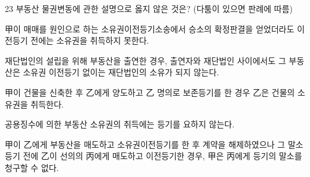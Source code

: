 \begin{question}{23}
부동산 물권변동에 관한 설명으로 옳지 않은 것은? (다툼이 있으면 판례에 따름)
\begin{choices}
  \item 甲이 매매를 원인으로 하는 소유권이전등기소송에서 승소의 확정판결을 얻었더라도 이전등기 전에는 소유권을 취득하지 못한다.
  \item 재단법인의 설립을 위해 부동산을 출연한 경우, 출연자와 재단법인 사이에서도 그 부동산은 소유권 이전등기 없이는 재단법인의 소유가 되지 않는다.
  \item 甲이 건물을 신축한 후 乙에게 양도하고 乙 명의로 보존등기를 한 경우 乙은 건물의 소유권을 취득한다.
  \item 공용징수에 의한 부동산 소유권의 취득에는 등기를 요하지 않는다.
  \item 甲이 乙에게 부동산을 매도하고 소유권이전등기를 한 후 계약을 해제하였으나 그 말소등기 전에 乙이 선의의 丙에게 매도하고 이전등기한 경우, 甲은 丙에게 등기의 말소를 청구할 수 없다.
\end{choices}
\end{question}
